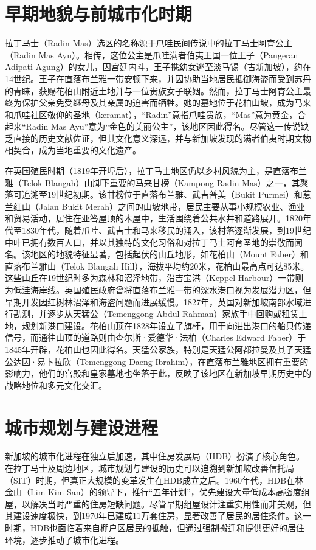 \documentclass[11pt,a4paper,twoside,openany]{book}
\begin{document}
\section{早期地貌与前城市化时期}
拉丁马士（Radin Mas）选区的名称源于爪哇民间传说中的拉丁马士阿育公主（Radin Mas Ayu）。相传，这位公主是爪哇满者伯夷王国一位王子（Pangeran Adipati Agung）的女儿，因宫廷内斗，王子携幼女逃至淡马锡（古新加坡），约在14世纪。王子在直落布兰雅一带安顿下来，并因协助当地居民抵御海盗而受到苏丹的青睐，获赐花柏山附近土地并与一位贵族女子联姻。然而，拉丁马士阿育公主最终为保护父亲免受继母及其亲属的迫害而牺牲。她的墓地位于花柏山坡，成为马来和爪哇社区敬仰的圣地（keramat），“Radin”意指爪哇贵族，“Mas”意为黄金，合起来“Radin Mas Ayu”意为“金色的美丽公主”，该地区因此得名。尽管这一传说缺乏直接的历史文献佐证，但其文化意义深远，并与新加坡发现的满者伯夷时期文物相契合，成为当地重要的文化遗产。

在英国殖民时期（1819年开埠后），拉丁马士地区仍以乡村风貌为主，是直落布兰雅（Telok Blangah）山脚下重要的马来甘榜（Kampong Radin Mas）之一，其聚落可追溯至19世纪初期。该甘榜位于直落布兰雅、武吉普美（Bukit Purmei）和惹兰红山（Jalan Bukit Merah）之间的山坡地带，居民主要从事小规模农业、渔业和贸易活动，居住在亚答屋顶的木屋中，生活围绕着公共水井和道路展开。1820年代至1830年代，随着爪哇、武吉士和马来移民的涌入，该村落逐渐发展，到19世纪中叶已拥有数百人口，并以其独特的文化习俗和对拉丁马士阿育圣地的崇敬而闻名。该地区的地貌特征显著，包括起伏的山丘地形，如花柏山（Mount Faber）和直落布兰雅山（Telok Blangah Hill），海拔平均约20米，花柏山最高点可达85米。这些山丘在19世纪时多为森林和沼泽地带，沿吉宝港（Keppel Harbour）一带则为低洼海岸线。英国殖民政府曾将直落布兰雅一带的深水港口视为发展潜力区，但早期开发因红树林沼泽和海盗问题而进展缓慢。1827年，英国对新加坡南部水域进行勘测，并逐步从天猛公（Temenggong Abdul Rahman）家族手中回购或租赁土地，规划新港口建设。花柏山顶在1828年设立了旗杆，用于向进出港口的船只传递信号，而通往山顶的道路则由查尔斯·爱德华·法柏（Charles Edward Faber）于1845年开辟，花柏山也因此得名。天猛公家族，特别是天猛公阿都拉曼及其子天猛公达因·易卜拉欣（Temenggong Daeng Ibrahim），在直落布兰雅地区拥有重要的影响力，他们的宫殿和皇家墓地也坐落于此，反映了该地区在新加坡早期历史中的战略地位和多元文化交汇。

\section{城市规划与建设进程}
新加坡的城市化进程在独立后加速，其中住房发展局（HDB）扮演了核心角色。在拉丁马士及周边地区，城市规划与建设的历史可以追溯到新加坡改善信托局（SIT）时期，但真正大规模的变革发生在HDB成立之后。1960年代，HDB在林金山（Lim Kim San）的领导下，推行“五年计划”，优先建设大量低成本高密度组屋，以解决当时严重的住房短缺问题。尽管早期组屋设计注重实用性而非美观，但其建设速度极快，到1970年已建成11万套住房，显著改善了居民的居住条件。这一时期，HDB也面临着来自棚户区居民的抵触，但通过强制搬迁和提供更好的居住环境，逐步推动了城市化进程。
\end{document}
